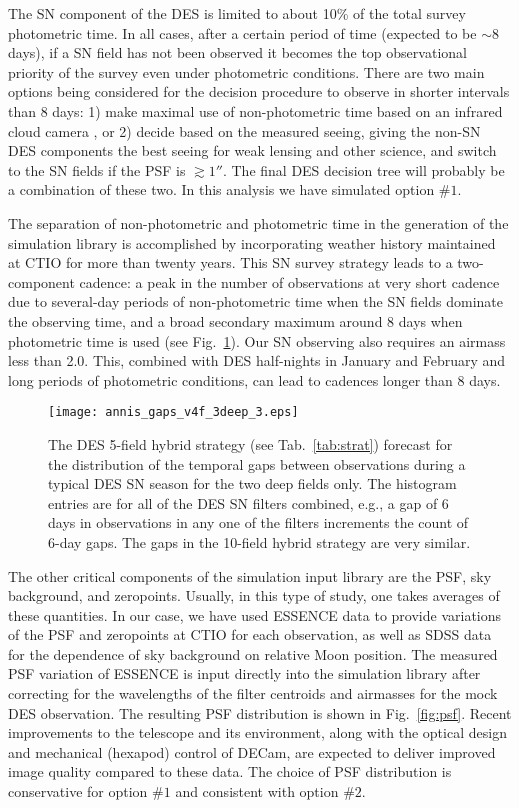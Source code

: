 \documentclass[preprint2]{aastex}    %
\begin{document}
The SN component of the DES is limited to about 10\% of the total survey photometric time. 
In all cases, after a certain period of time (expected to be $\sim$8 days), if a SN field 
has not been observed it becomes the top observational priority of the survey even 
under photometric conditions.  There are two main options being considered for the 
decision procedure to observe in shorter intervals than 8 days: 1) make maximal 
use of non-photometric time based on an infrared cloud camera \citep[RASICAM,][]{rasicam}, or 2) decide 
based on the measured seeing,  giving the non-SN DES components the best seeing for 
weak lensing and other science,  and switch to the SN fields if the PSF is 
$\gtrsim 1''$.  The final DES decision tree will probably be a combination 
of these two.  In this analysis we have simulated option $\#1$.

The separation of non-photometric and 
photometric time in the generation of the simulation library is accomplished by 
incorporating weather history maintained at CTIO for more than twenty years. This SN survey 
strategy leads to a two-component cadence: a peak in the number of observations 
at very short cadence due to several-day periods of non-photometric time when the
SN fields dominate the observing time, and a broad secondary maximum around 8 days 
when photometric time is used (see Fig.~\ref{fig:cadence}). 
Our SN observing also requires an airmass less than 2.0.  This, combined with 
DES half-nights in January and February and long periods of photometric conditions, 
can lead to cadences longer than 8 days.

\begin{figure}[ht]
\centerline{\texttt{[image: annis\_gaps\_v4f\_3deep\_3.eps]}}
\caption{The DES 5-field hybrid strategy 
(see Tab.~\ref{tab:strat})
forecast for the distribution of the temporal gaps between observations 
during a typical DES SN season for the two deep fields only. The histogram entries are for all of the DES SN filters combined,
e.g., a gap of 6 days in observations in any one of the filters increments the 
count of 6-day gaps. The gaps in the 10-field hybrid strategy are very similar.}
\label{fig:cadence}
\end{figure}

The other critical components of the simulation input library are the PSF, sky 
background, and zeropoints.  Usually, in this type of study, one takes averages 
of these quantities. In our case, we have used ESSENCE data to provide variations of the 
PSF and 
zeropoints at CTIO for each observation, as well as SDSS data for the dependence of sky 
background on relative Moon position. The measured PSF variation of ESSENCE is input 
directly into the simulation library after correcting for 
the wavelengths of the filter centroids and airmasses for the mock DES observation.  
The resulting PSF distribution is shown in Fig.~\ref{fig:psf}.  
Recent improvements to the telescope and its environment, along with the optical 
design and mechanical (hexapod) control of DECam, are expected to 
deliver improved image quality compared to these data. The choice of PSF distribution is 
conservative for option  $\#1$ and consistent with option $\#2$. 
\end{document}
